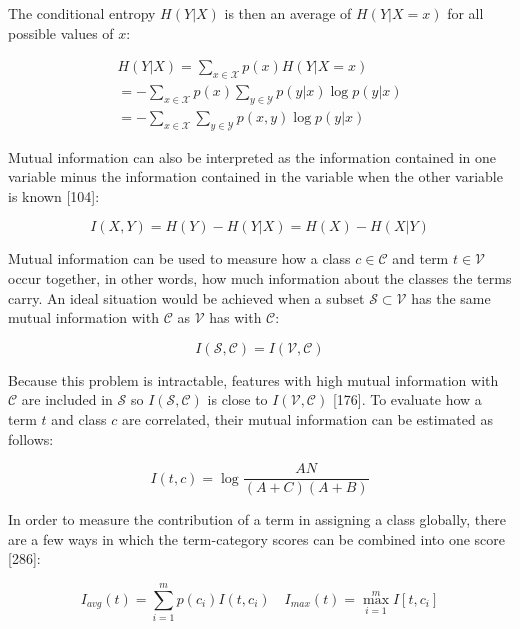 \documentclass[11pt,openany,executivepaper]{book}
\begin{document}
The conditional entropy $H(Y|X)$ is then an average of $H(Y|X = x)$ for all possible values of $x$:

\begin{equation}
\begin{split}
    H(Y|X) = \sum_{x \in \mathcal{X}} p(x) H(Y|X = x) \\
    = -\sum_{x \in \mathcal{X}} p(x) \sum_{y \in \mathcal{Y}} p(y|x) \log p(y|x) \\
    = -\sum_{x \in \mathcal{X}} \sum_{y \in \mathcal{Y}} p(x,y) \log p(y|x)
\end{split}
\end{equation}

Mutual information can also be interpreted as the information contained in one variable minus the information contained in the variable when the other variable is known [104]:

\begin{equation}
    I(X,Y) = H(Y) - H(Y|X) = H(X) - H(X|Y)
\end{equation}

Mutual information can be used to measure how a class $c \in \mathcal{C}$ and term $t \in \mathcal{V}$ occur together, in other words, how much information about the classes the terms carry. An ideal situation would be achieved when a subset $\mathcal{S} \subset \mathcal{V}$ has the same mutual information with $\mathcal{C}$ as $\mathcal{V}$ has with $\mathcal{C}$:

\begin{equation}
    I(\mathcal{S}, \mathcal{C}) = I(\mathcal{V}, \mathcal{C})
\end{equation}

Because this problem is intractable, features with high mutual information with $\mathcal{C}$ are included in $\mathcal{S}$ so $I(\mathcal{S}, \mathcal{C})$ is close to $I(\mathcal{V}, \mathcal{C})$ [176]. To evaluate how a term $t$ and class $c$ are correlated, their mutual information can be estimated as follows:

\begin{equation}
    I(t, c) = \log \frac{AN}{(A+C)(A+B)}
\end{equation}

In order to measure the contribution of a term in assigning a class globally, there are a few ways in which the term-category scores can be combined into one score [286]:

\begin{equation}
    I_{avg}(t) = \sum_{i=1}^{m} p(c_i) I(t, c_i) \quad I_{max}(t) = \max_{i=1}^{m} I[t, c_i]
\end{equation}
\end{document}
